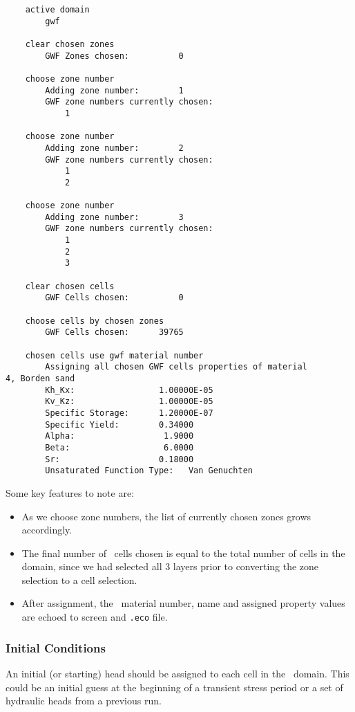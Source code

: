 {\begin{verbatim}
    active domain
    	gwf

    clear chosen zones
    	GWF Zones chosen:          0

    choose zone number
    	Adding zone number:        1
    	GWF zone numbers currently chosen:
    	    1

    choose zone number
    	Adding zone number:        2
    	GWF zone numbers currently chosen:
    	    1
    	    2

    choose zone number
    	Adding zone number:        3
    	GWF zone numbers currently chosen:
    	    1
    	    2
    	    3

    clear chosen cells
    	GWF Cells chosen:          0

    choose cells by chosen zones
    	GWF Cells chosen:      39765

    chosen cells use gwf material number
    	Assigning all chosen GWF cells properties of material               4, Borden sand
    	Kh_Kx:                 1.00000E-05
    	Kv_Kz:                 1.00000E-05
    	Specific Storage:      1.20000E-07
    	Specific Yield:        0.34000
    	Alpha:                  1.9000
    	Beta:                   6.0000
    	Sr:                    0.18000
    	Unsaturated Function Type:   Van Genuchten
\end{verbatim}

Some key features to note are:
\begin{itemize}
    \item As we choose zone numbers, the list of currently chosen zones grows accordingly.
    \item The final number of \gwf\ cells chosen is equal to the total number of cells in the domain, since we had selected all 3 layers prior to converting the  zone selection to a cell selection.
    \item After assignment, the \gwf\ material number, name and assigned property values are echoed to screen and \texttt{.eco} file.
\end{itemize}

\subsubsection{Initial Conditions}  
An initial (or starting) head should be assigned to each cell in the \gwf\ domain.  This could be an initial guess at the beginning of a transient stress period or a set of hydraulic heads from a previous run.

}
